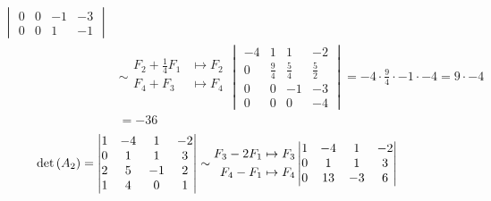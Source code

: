 \begin{enumerate}[label=\listAlph]
\[\begin{aligned}
\begin{vmatrix}
                        0 & 0 & -1 & -3 \\
                        0 & 0 & 1 & -1
                    \end{vmatrix}
                    \\
                    &\sim
                    \begin{aligned}
                        F_2 + \frac{1}{4}F_1 &\mapsto F_2 \\
                        F_4 + F_3 &\mapsto F_4 \\
                    \end{aligned}
                    \begin{vmatrix}
                        -4 & 1 & 1 & -2 \\
                        0 & \frac{9}{4} & \frac{5}{4} & \frac{5}{2} \\
                        0 & 0 & -1 & -3 \\
                        0 & 0 & 0 & -4
                    \end{vmatrix}
                    =
                    -4 \cdot \frac{9}{4} \cdot -1 \cdot -4
                    = 9 \cdot -4
                    \\
                    &= -36
                \end{aligned}
            \]
            \[
                \begin{aligned}
                    \text{det} \left( A_2 \right)
                    &=
                    \begin{vmatrix}
                        1 & -4 & 1 & -2 \\
                        0 & 1 & 1 & 3 \\
                        2 & 5 & -1 & 2 \\
                        1 & 4 & 0 & 1
                    \end{vmatrix}
                    \sim
                    \begin{aligned}
                        F_3 - 2F_1 &\mapsto F_3 \\
                        F_4 - F_1 &\mapsto F_4 \\
                    \end{aligned}
                    \begin{vmatrix}
                        1 & -4 & 1 & -2 \\
                        0 & 1 & 1 & 3 \\
                        0 & 13 & -3 & 6 \\

\end{vmatrix}
\end{aligned}\]
\end{enumerate}
